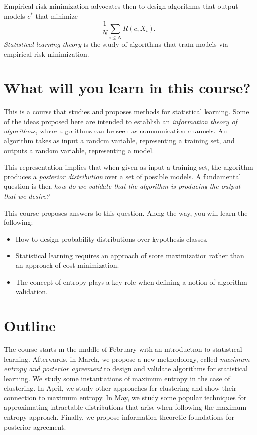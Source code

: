 Empirical risk minimization advocates then to design algorithms that
output models $c^*$ that minimize
%
\begin{equation}
\frac{1}{N}\sum_{i \leq N}R(c, X_i).
\end{equation}
%
\emph{Statistical learning theory} is the study of algorithms that train models
via empirical risk minimization.

\section*{What will you learn in this course?}

This is a course that studies and proposes methods for statistical learning.
Some of the ideas proposed here are intended to establish an \emph{information
theory of algorithms}, where algorithms can be seen as communication
channels. An algorithm takes as input a random variable, representing a
training set, and outputs a random variable, representing a model.

This representation implies that when given as input a training
set, the algorithm produces a \emph{posterior distribution} over a set of possible
models. A fundamental question is then \emph{how do we validate that the
algorithm is producing the output that we desire?}

This course proposes answers to this question. Along the way, you will
learn the following:

\begin{itemize}
\item How to design probability distributions over hypothesis classes.
\item Statistical learning requires an approach of score maximization rather
than an approach of cost minimization.
\item The concept of entropy plays a key role when defining a notion of
algorithm validation.
\end{itemize}

\section*{Outline}

The course starts in the middle of February with an introduction to statistical
learning. Afterwards, in March, we propose a new methodology,
called \emph{maximum entropy and posterior agreement} to design and validate
algorithms for statistical learning. We study some instantiations of maximum
entropy in the case of clustering. In April, we study other approaches
for clustering and show their connection to maximum entropy. In May, we
study some popular techniques for approximating intractable distributions that arise when following the maximum-entropy approach. Finally, we propose
information-theoretic foundations for posterior agreement.

